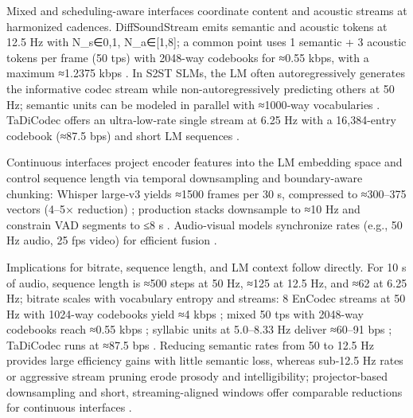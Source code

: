 \documentclass{article}
\begin{document}
Mixed and scheduling-aware interfaces coordinate content and acoustic streams at harmonized cadences. DiffSoundStream emits semantic and acoustic tokens at 12.5 Hz with N_s∈{0,1}, N_a∈[1,8]; a common point uses 1 semantic + 3 acoustic tokens per frame (50 tps) with 2048-way codebooks for ≈0.55 kbps, with a maximum ≈1.2375 kbps \cite{yang2025diffsoundstreamefficientspeechtokenizati}. In S2ST SLMs, the LM often autoregressively generates the informative codec stream while non-autoregressively predicting others at 50 Hz; semantic units can be modeled in parallel with ≈1000‑way vocabularies \cite{peng2024mslms2stmultitaskspeechlanguagemodeltext}. TaDiCodec offers an ultra‑low‑rate single stream at 6.25 Hz with a 16,384-entry codebook (≈87.5 bps) and short LM sequences \cite{wang2025tadicodectextawarediffusionspeechtokeniz}.

Continuous interfaces project encoder features into the LM embedding space and control sequence length via temporal downsampling and boundary-aware chunking: Whisper large‑v3 yields ≈1500 frames per 30 s, compressed to ≈300–375 vectors (4–5× reduction) \cite{nguyen2025qwenvsgemmaintegrationwhispercomparative}; production stacks downsample to ≈10 Hz and constrain VAD segments to ≤8 s \cite{li2025seewossubmissionmlcslmlessonslearnedspee}. Audio‑visual models synchronize rates (e.g., 50 Hz audio, 25 fps video) for efficient fusion \cite{sadok2025vectorquantizedmaskedautoencoderaudiovis}.

Implications for bitrate, sequence length, and LM context follow directly. For 10 s of audio, sequence length is ≈500 steps at 50 Hz, ≈125 at 12.5 Hz, and ≈62 at 6.25 Hz; bitrate scales with vocabulary entropy and streams: 8 EnCodec streams at 50 Hz with 1024-way codebooks yield ≈4 kbps \cite{peng2024mslms2stmultitaskspeechlanguagemodeltext}; mixed 50 tps with 2048-way codebooks reach ≈0.55 kbps \cite{yang2025diffsoundstreamefficientspeechtokenizati}; syllabic units at 5.0–8.33 Hz deliver ≈60–91 bps \cite{baade2024syllablelmlearningcoarsesemanticunitsspe}; TaDiCodec runs at ≈87.5 bps \cite{wang2025tadicodectextawarediffusionspeechtokeniz}. Reducing semantic rates from 50 to 12.5 Hz provides large efficiency gains with little semantic loss, whereas sub‑12.5 Hz rates or aggressive stream pruning erode prosody and intelligibility; projector-based downsampling and short, streaming-aligned windows offer comparable reductions for continuous interfaces \cite{zeng2024scalingspeechtextpretrainingsyntheticint,nguyen2025qwenvsgemmaintegrationwhispercomparative,li2025seewossubmissionmlcslmlessonslearnedspee}.
\end{document}
